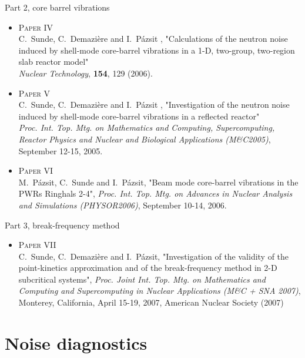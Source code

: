 \documentclass[clock,style=fyma,paper=screen,blackslide,trans=Wipe,mode=present]{powerdot}
\begin{document}
\begin{slide}{Part 2, core barrel vibrations}
\begin{itemize}
\item
\textsc{Paper IV}\\C.~Sunde, C.~Demazi\`{e}re and I.~P\'{a}zsit , "Calculations of the neutron noise induced by shell-mode core-barrel vibrations in a 1-D, two-group, two-region slab reactor model"\\
\emph{Nuclear Technology}, {\bf 154}, 129 (2006).

\item
\textsc{Paper V}\\C.~Sunde, C.~Demazi\`{e}re and I.~P\'{a}zsit , "Investigation of the neutron noise induced by shell-mode core-barrel vibrations in a reflected reactor"\\
\emph{Proc. Int. Top. Mtg. on Mathematics and Computing,
Supercomputing, Reactor Physics and Nuclear and Biological
Applications (M\&C2005)}, September 12-15, 2005. \item
\textsc{Paper VI}\\M.~P\'{a}zsit, C.~Sunde and I.~P\'{a}zsit,
"Beam mode core-barrel vibrations in the PWRs Ringhals 2-4",
\emph{Proc. Int. Top. Mtg. on Advances in Nuclear Analysis and
Simulations (PHYSOR2006)}, September 10-14,
2006.
\end{itemize}
\end{slide}

\begin{slide}{Part 3, break-frequency method}
\begin{itemize}
\item \textsc{Paper VII}\\
C.~Sunde, C.~Demazi\`{e}re and I.~P\'{a}zsit, "Investigation of
the validity of the point-kinetics approximation and of the
break-frequency method in 2-D subcritical systems", \emph{Proc.
Joint Int. Top. Mtg. on Mathematics and Computing and
Supercomputing in Nuclear Applications (M\&C + SNA 2007)},
Monterey, California, April 15-19, 2007, American Nuclear Society
(2007)
\end{itemize}
\end{slide}

\section[slide=false]{Noise diagnostics}
\end{document}
